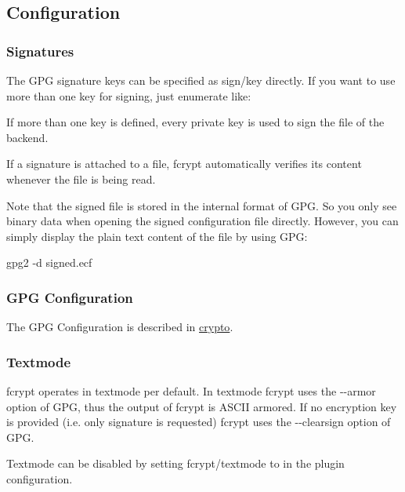 \subsection*{Configuration}

\subsubsection*{Signatures}

The G\+PG signature keys can be specified as {\ttfamily sign/key} directly. If you want to use more than one key for signing, just enumerate like\+: 


If more than one key is defined, every private key is used to sign the file of the backend.

If a signature is attached to a file, {\ttfamily fcrypt} automatically verifies its content whenever the file is being read.

Note that the signed file is stored in the internal format of G\+PG. So you only see binary data when opening the signed configuration file directly. However, you can simply display the plain text content of the file by using G\+PG\+: \begin{DoxyVerb}    gpg2 -d signed.ecf
\end{DoxyVerb}


\subsubsection*{G\+PG Configuration}

The G\+PG Configuration is described in \hyperlink{md_src_plugins_crypto_README_src_plugins_crypto_README_md}{crypto}.

\subsubsection*{Textmode}

{\ttfamily fcrypt} operates in textmode per default. In textmode {\ttfamily fcrypt} uses the {\ttfamily -\/-\/armor} option of G\+PG, thus the output of {\ttfamily fcrypt} is A\+S\+C\+II armored. If no encryption key is provided (i.\+e. only signature is requested) {\ttfamily fcrypt} uses the {\ttfamily -\/-\/clearsign} option of G\+PG.

Textmode can be disabled by setting {\ttfamily fcrypt/textmode} to {} in the plugin configuration.

